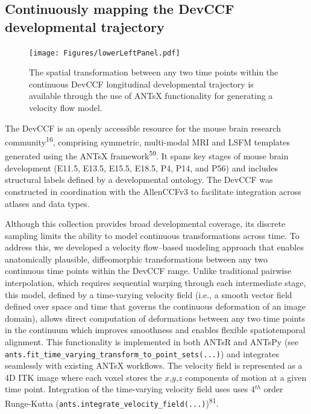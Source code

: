\documentclass[
  12pt,
]{article}
\begin{document}
\subsection{Continuously mapping the DevCCF developmental
trajectory}\label{continuously-mapping-the-devccf-developmental-trajectory}

\begin{figure}
\centering
\texttt{[image: Figures/lowerLeftPanel.pdf]} \caption{The
spatial transformation between any two time points within the continuous DevCCF
longitudinal developmental trajectory is available through the use of ANTsX
functionality for generating a velocity flow model.}
\label{fig:devccfvelocity}
\end{figure}

The DevCCF is an openly accessible resource for the mouse brain research
community\textsuperscript{16}, comprising symmetric, multi-modal MRI and
LSFM templates generated using the ANTsX framework\textsuperscript{59}.
It spans key stages of mouse brain development (E11.5, E13.5, E15.5,
E18.5, P4, P14, and P56) and includes structural labels defined by a
developmental ontology. The DevCCF was constructed in coordination with
the AllenCCFv3 to facilitate integration across atlases and data types.

Although this collection provides broad developmental coverage, its
discrete sampling limits the ability to model continuous transformations
across time. To address this, we developed a velocity flow--based
modeling approach that enables anatomically plausible, diffeomorphic
transformations between any two continuous time points within the DevCCF
range. Unlike traditional pairwise interpolation, which requires
sequential warping through each intermediate stage, this model, defined
by a time-varying velocity field (i.e., a smooth vector field defined
over space and time that governs the continuous deformation of an image
domain), allows direct computation of deformations between any two time
points in the continuum which improves smoothness and enables flexible
spatiotemporal alignment. This functionality is implemented in both
ANTsR and ANTsPy (see
\texttt{ants.fit\_time\_varying\_transform\_to\_point\_sets(...)}) and
integrates seamlessly with existing ANTsX workflows. The velocity field
is represented as a 4D ITK image where each voxel stores the
\(x\),\(y\),\(z\) components of motion at a given time point.
Integration of the time-varying velocity field uses uses 4\(^{th}\)
order Runge-Kutta
(\texttt{ants.integrate\_velocity\_field(...)})\textsuperscript{81}.
\end{document}
